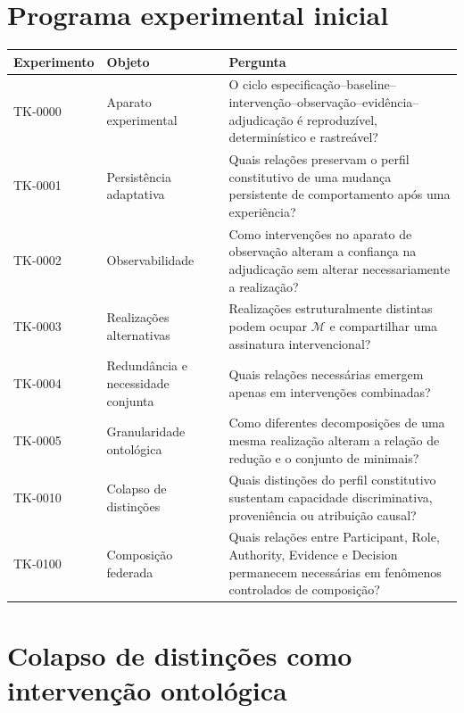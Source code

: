 \documentclass[11pt,a4paper]{article}
\begin{document}
\section{Programa experimental inicial}

\begin{longtable}{p{2.1cm}p{4.2cm}p{7.8cm}}
\toprule
Experimento & Objeto & Pergunta \\
\midrule
\endhead
TK-0000 &
Aparato experimental &
O ciclo especificação--baseline--intervenção--observação--evidência--adjudicação é
reproduzível, determinístico e rastreável? \\

TK-0001 &
Persistência adaptativa &
Quais relações preservam o perfil constitutivo de uma mudança persistente de
comportamento após uma experiência? \\

TK-0002 &
Observabilidade &
Como intervenções no aparato de observação alteram a confiança na adjudicação sem
alterar necessariamente a realização? \\

TK-0003 &
Realizações alternativas &
Realizações estruturalmente distintas podem ocupar $\mathcal M$ e compartilhar uma
assinatura intervencional? \\

TK-0004 &
Redundância e necessidade conjunta &
Quais relações necessárias emergem apenas em intervenções combinadas? \\

TK-0005 &
Granularidade ontológica &
Como diferentes decomposições de uma mesma realização alteram a relação de redução e
o conjunto de minimais? \\

TK-0010 &
Colapso de distinções &
Quais distinções do perfil constitutivo sustentam capacidade discriminativa,
proveniência ou atribuição causal? \\

TK-0100 &
Composição federada &
Quais relações entre Participant, Role, Authority, Evidence e Decision permanecem
necessárias em fenômenos controlados de composição? \\
\bottomrule
\end{longtable}

\section{Colapso de distinções como intervenção ontológica}
\end{document}
